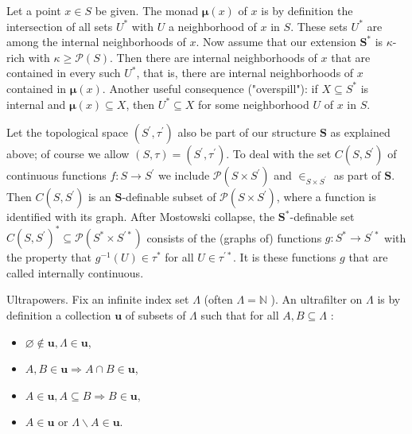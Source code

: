 \documentclass[10pt]{article}
\begin{document}
Let a point $x \in S$ be given. The monad $\boldsymbol{\mu}(x)$ of $x$ is by definition the intersection of all sets $U^{*}$ with $U$ a neighborhood of $x$ in $S$. These sets $U^{*}$ are among the internal neighborhoods of $x$. Now assume that our extension $\mathbf{S}^{*}$ is $\kappa$-rich with $\kappa \geq \mathcal{P}(S)$. Then there are internal neighborhoods of $x$ that are contained in every such $U^{*}$, that is, there are internal neighborhoods of $x$ contained in $\boldsymbol{\mu}(x)$. Another useful consequence ("overspill"): if $X \subseteq S^{*}$ is internal and $\boldsymbol{\mu}(x) \subseteq X$, then $U^{*} \subseteq X$ for some neighborhood $U$ of $x$ in $S$.

Let the topological space $\left(S^{\prime}, \tau^{\prime}\right)$ also be part of our structure $\mathbf{S}$ as explained above; of course we allow $(S, \tau)=\left(S^{\prime}, \tau^{\prime}\right)$. To deal with the set $C\left(S, S^{\prime}\right)$ of continuous functions $f: S \rightarrow S^{\prime}$ we include $\mathcal{P}\left(S \times S^{\prime}\right)$ and $\in_{S \times S^{\prime}}$ as part of $\mathbf{S}$. Then $C\left(S, S^{\prime}\right)$ is an $\mathbf{S}$-definable subset of $\mathcal{P}\left(S \times S^{\prime}\right)$, where a function is identified with its graph. After Mostowski collapse, the $\mathbf{S}^{*}$-definable set $C\left(S, S^{\prime}\right)^{*} \subseteq \mathcal{P}\left(S^{*} \times S^{\prime *}\right)$ consists of the (graphs of) functions $g: S^{*} \rightarrow S^{\prime *}$ with the property that $g^{-1}(U) \in \tau^{*}$ for all $U \in \tau^{\prime *}$. It is these functions $g$ that are called internally continuous.

Ultrapowers. Fix an infinite index set $\Lambda$ (often $\Lambda=\mathbb{N}$ ). An ultrafilter on $\Lambda$ is by definition a collection $\mathbf{u}$ of subsets of $\Lambda$ such that for all $A, B \subseteq \Lambda$ :

\begin{itemize}
  \item[(1)] $\varnothing \notin \mathbf{u}, \Lambda \in \mathbf{u}$,
  \item[(2)] $A, B \in \mathbf{u} \Longrightarrow A \cap B \in \mathbf{u}$,
  \item[(3)] $A \in \mathbf{u}, A \subseteq B \Longrightarrow B \in \mathbf{u}$,
  \item[(4)] $A \in \mathbf{u}$ or $\Lambda \backslash A \in \mathbf{u}$.
\end{itemize}
\end{document}
